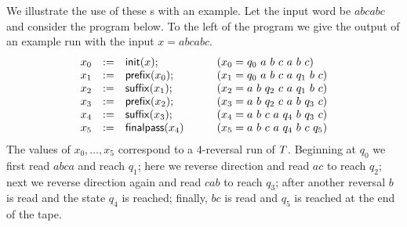 We illustrate the use of these \FT{}s with an example.  Let the input word be
$a b c a b c$
and consider the program below.
%
To the left of the program we give the output of an example run with the input
$x = a b c a b c$.
%
\[
    \begin{array}{rcll}
        x_0 &:=& \mathsf{init}(x);
            & \qquad (x_0 = q_0\ a\ b\ c\ a\ b\ c) \\
        x_1 &:=& \mathsf{prefix}(x_0);
            & \qquad (x_1 = q_0\ a\ b\ c\ a\ q_1\ b\ c) \\
        x_2 &:=& \mathsf{suffix}(x_1);
            & \qquad (x_2 = a\ b\ q_2\ c\ a\ q_1\ b\ c) \\
        x_3 &:=& \mathsf{prefix}(x_2);
            & \qquad (x_3 = a\ b\ q_2\ c\ a\ b\ q_3\ c) \\
        x_4 &:=& \mathsf{suffix}(x_3);
            & \qquad (x_4 = a\ b\ c\ a\ q_4\ b\ q_3\ c) \\
        x_5 &:=& \mathsf{finalpass}(x_4)
            & \qquad (x_5 = a\ b\ c\ a\ q_4\ b\ c\ q_5) \\
    \end{array}
\]
%
The values of
$x_0, \ldots, x_5$
correspond to a $4$-reversal run of $T$.
%
Beginning at $q_0$ we first read $abca$ and reach $q_1$; here we reverse
direction and read $ac$ to reach $q_2$; next we reverse direction again and
read $c a b$ to reach $q_3$; after another reversal $b$ is read and the state
$q_4$ is reached; finally, $bc$ is read and $q_5$ is reached at the end of the
tape.

